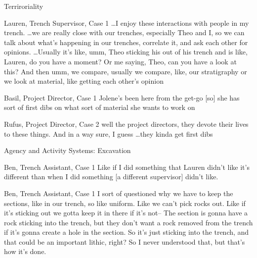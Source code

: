 \documentclass{beamer}
\begin{document}
\begin{frame}{Terriroriality}
  \begin{block}{Lauren, Trench Supervisor, Case 1}
  \dots I enjoy these interactions with people in my trench. \dots we are really close with our trenches, especially Theo and I, so we can talk about what’s happening in our trenches, correlate it, and ask each other for opinions. \dots Usually it’s like, umm, Theo sticking his out of his trench and is like, Lauren, do you have a moment? Or me saying, Theo, can you have a look at this? And then umm, we compare, usually we compare, like, our stratigraphy or we look at material, like getting each other’s opinion
  \end{block}
  
  \begin{block}{Basil, Project Director, Case 1}
  Jolene’s been here from the get-go [so] she has sort of first dibs on what sort of material she wants to work on
  \end{block}

  \begin{block}{Rufus, Project Director, Case 2}
  well the project directors, they devote their lives to these things. And in a way sure, I guess \dots they kinda get first dibs
\end{block}


\end{frame}

\begin{frame}{Agency and Activity Systems: Excavation}

  \begin{block}{Ben, Trench Assistant, Case 1}
    Like if I did something that Lauren didn’t like it’s different than when I did something [a different supervisor] didn’t like.
  \end{block}
  
  \begin{block}{Ben, Trench Assistant, Case 1}
    I sort of questioned why we have to keep the sections, like in our trench, so like uniform. Like we can’t pick rocks out. Like if it’s sticking out we gotta keep it in there if it’s not-- The section is gonna have a rock sticking into the trench, but they don’t want a rock removed from the trench if it’s gonna create a hole in the section. So it’s just sticking into the trench, and that could be an important lithic, right? So I never understood that, but that’s how it’s done.
  \end{block}

\end{frame}
\end{document}
